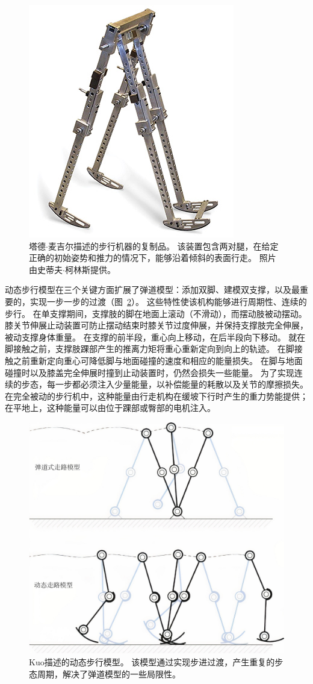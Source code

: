 \begin{figure}[!htb]
	\centering
	\includegraphics[width=0.6\linewidth]{chap2/2_13}
	\caption{塔德$\cdot$麦吉尔\cite{mcgeer1990passive}描述的步行机器的复制品。
		该装置包含两对腿，在给定正确的初始姿势和推力的情况下，能够沿着倾斜的表面行走。
		照片由史蒂夫$\cdot$柯林斯提供。 \label{fig:2_13}}
\end{figure}



动态步行模型在三个关键方面扩展了弹道模型：添加双脚、建模双支撑，以及最重要的，实现一步一步的过渡（图~\ref{fig:2_14}）。
这些特性使该机构能够进行周期性、连续的步行。
在单支撑期间，支撑肢的脚在地面上滚动（不滑动），而摆动肢被动摆动。
膝关节伸展止动装置可防止摆动结束时膝关节过度伸展，并保持支撑肢完全伸展，被动支撑身体重量。
在支撑的前半段，重心向上移动，在后半段向下移动。
就在脚接触之前，支撑肢踝部产生的推离力矩将重心重新定向到向上的轨迹。
在脚接触之前重新定向重心可降低脚与地面碰撞的速度和相应的能量损失。
在脚与地面碰撞时以及膝盖完全伸展时撞到止动装置时，仍然会损失一些能量。
为了实现连续的步态，每一步都必须注入少量能量，以补偿能量的耗散以及关节的摩擦损失。
在完全被动的步行机中，这种能量由行走机构在缓坡下行时产生的重力势能提供；
在平地上，这种能量可以由位于踝部或臀部的电机注入。


\begin{figure}[!htb]
	\centering
	\includegraphics[width=0.6\linewidth]{chap2/2_14}
	\caption{Kuo\cite{kuo2010dynamic}描述的动态步行模型。
		该模型通过实现步进过渡，产生重复的步态周期，解决了弹道模型的一些局限性。 \label{fig:2_14}}
\end{figure}


